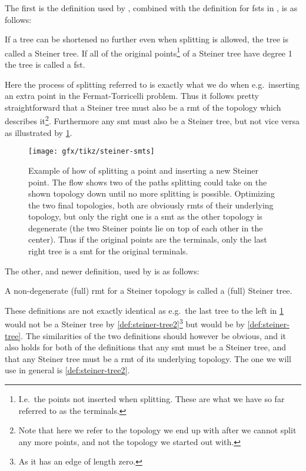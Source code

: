 The first is the definition used by \textcite{gilbert1968}, combined with the
definition for \acp{fst} in \textcite{smith1992}, is as follows:
%
\begin{definition}
  If a tree can be shortened no further even when splitting is allowed, the tree
  is called a Steiner tree. If all of the original points\footnote{I.e.\ the
    points not inserted when splitting. These are what we have so far referred
    to as the terminals.} of a Steiner tree have degree 1 the tree is called a
  \acl{fst}.\label{def:steiner-tree}
\end{definition}
%
Here the process of splitting referred to is exactly what we do when e.g.\
inserting an extra point in the Fermat-Torricelli problem. Thus it follows
pretty straightforward that a Steiner tree must also be a \ac{rmt} of the
topology which describes it\footnote{Note that here we refer to the topology we
  end up with after we cannot split any more points, and not the topology we
  started out with.}. Furthermore any \ac{smt} must also be a Steiner tree, but
not vice versa as illustrated by \cref{fig:steiner-smts}.
%
\begin{figure}[htbp]
\centering
\texttt{[image: gfx/tikz/steiner-smts]}
\caption[Example of splitting and \acp{rmt}]{Example of how of splitting a point
  and inserting a new Steiner point. The flow shows two of the paths splitting
  could take on the shown topology down until no more splitting is
  possible. Optimizing the two final topologies, both are obviously \acp{rmt} of
  their underlying topology, but only the right one is a \ac{smt} as the other
  topology is degenerate (the two Steiner points lie on top of each other in the
  center). Thus if the original points are the terminals, only the last right
  tree is a \ac{smt} for the original terminals.\label{fig:steiner-smts}}
\end{figure}
%
The other, and newer definition, used by \textcite{brazil2015} is as follows:
%
\begin{definition}
  A non-degenerate (full) \ac{rmt} for a Steiner topology is called a (full)
  Steiner tree.\label{def:steiner-tree2}
\end{definition}
%
These definitions are not exactly identical as e.g.\ the last tree to the left
in \cref{fig:steiner-smts} would not be a Steiner tree by
\cref{def:steiner-tree2}\footnote{As it has an edge of length zero.}  but would
be by \cref{def:steiner-tree}. The similarities of the two definitions should
however be obvious, and it also holds for both of the definitions that any
\ac{smt} must be a Steiner tree, and that any Steiner tree must be a \ac{rmt} of
its underlying topology. The one we will use in general is
\cref{def:steiner-tree2}.

